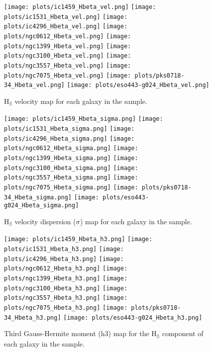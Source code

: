 \documentclass[fleqn,usenatbib,useAMS]{mnras}
\begin{document}
		\begin{figure*}
			\centering
			\texttt{[image: plots/ic1459\_Hbeta\_vel.png]}
			\texttt{[image: plots/ic1531\_Hbeta\_vel.png]}
			\texttt{[image: plots/ic4296\_Hbeta\_vel.png]}
			\texttt{[image: plots/ngc0612\_Hbeta\_vel.png]}
			\texttt{[image: plots/ngc1399\_Hbeta\_vel.png]}
			\texttt{[image: plots/ngc3100\_Hbeta\_vel.png]}
			\texttt{[image: plots/ngc3557\_Hbeta\_vel.png]}
			\texttt{[image: plots/ngc7075\_Hbeta\_vel.png]}
			\texttt{[image: plots/pks0718-34\_Hbeta\_vel.png]}
			\texttt{[image: plots/eso443-g024\_Hbeta\_vel.png]}
			\caption{H$_\mathrm{\beta}$ velocity map for each galaxy in the sample.}
			\label{fig:Hbeta_vel}
		\end{figure*}

		\begin{figure*}
			\centering
			\texttt{[image: plots/ic1459\_Hbeta\_sigma.png]}
			\texttt{[image: plots/ic1531\_Hbeta\_sigma.png]}
			\texttt{[image: plots/ic4296\_Hbeta\_sigma.png]}
			\texttt{[image: plots/ngc0612\_Hbeta\_sigma.png]}
			\texttt{[image: plots/ngc1399\_Hbeta\_sigma.png]}
			\texttt{[image: plots/ngc3100\_Hbeta\_sigma.png]}
			\texttt{[image: plots/ngc3557\_Hbeta\_sigma.png]}
			\texttt{[image: plots/ngc7075\_Hbeta\_sigma.png]}
			\texttt{[image: plots/pks0718-34\_Hbeta\_sigma.png]}
			\texttt{[image: plots/eso443-g024\_Hbeta\_sigma.png]}
			\caption{H$_\mathrm{\beta}$ velocity dispersion ($\mathrm{\sigma}$) map for each galaxy in the sample.}
			\label{fig:Hbeta_sigma}
		\end{figure*}


		\begin{figure*}
			\centering
			\texttt{[image: plots/ic1459\_Hbeta\_h3.png]}
			\texttt{[image: plots/ic1531\_Hbeta\_h3.png]}
			\texttt{[image: plots/ic4296\_Hbeta\_h3.png]}
			\texttt{[image: plots/ngc0612\_Hbeta\_h3.png]}
			\texttt{[image: plots/ngc1399\_Hbeta\_h3.png]}
			\texttt{[image: plots/ngc3100\_Hbeta\_h3.png]}
			\texttt{[image: plots/ngc3557\_Hbeta\_h3.png]}
			\texttt{[image: plots/ngc7075\_Hbeta\_h3.png]}
			\texttt{[image: plots/pks0718-34\_Hbeta\_h3.png]}
			\texttt{[image: plots/eso443-g024\_Hbeta\_h3.png]}
			\caption{Third Gauss-Hermite moment (h3) map for the H$_\mathrm{\beta}$ component of each galaxy in the sample.}
			\label{fig:Hbeta_h3}
		\end{figure*}
\end{document}
